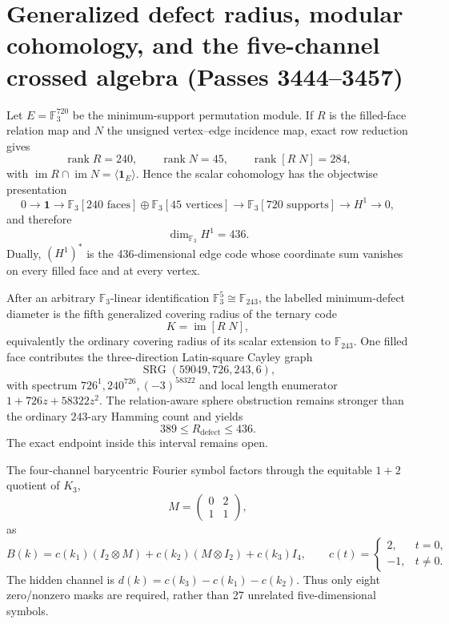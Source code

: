 \section{Generalized defect radius, modular cohomology, and the five-channel crossed algebra (Passes 3444--3457)}

Let $E=\mathbb F_3^{720}$ be the minimum-support permutation module.  If $R$ is the filled-face relation map and $N$ the unsigned vertex--edge incidence map, exact row reduction gives
\[
\operatorname{rank}R=240,
\qquad
\operatorname{rank}N=45,
\qquad
\operatorname{rank}[R\;N]=284,
\]
with $\operatorname{im}R\cap\operatorname{im}N=\langle\mathbf 1_E\rangle$.  Hence the scalar cohomology has the objectwise presentation
\[
0\longrightarrow\mathbf 1
\longrightarrow
\mathbb F_3[240\text{ faces}]\oplus\mathbb F_3[45\text{ vertices}]
\longrightarrow
\mathbb F_3[720\text{ supports}]
\longrightarrow H^1
\longrightarrow0,
\]
and therefore
\[
\boxed{\dim_{\mathbb F_3}H^1=436}.
\]
Dually, $(H^1)^*$ is the 436-dimensional edge code whose coordinate sum vanishes on every filled face and at every vertex.

After an arbitrary $\mathbb F_3$-linear identification $\mathbb F_3^5\cong\mathbb F_{243}$, the labelled minimum-defect diameter is the fifth generalized covering radius of the ternary code
\[
K=\operatorname{im}[R\;N],
\]
equivalently the ordinary covering radius of its scalar extension to $\mathbb F_{243}$.  One filled face contributes the three-direction Latin-square Cayley graph
\[
\operatorname{SRG}(59049,726,243,6),
\]
with spectrum $726^1,240^{726},(-3)^{58322}$ and local length enumerator $1+726z+58322z^2$.  The relation-aware sphere obstruction remains stronger than the ordinary $243$-ary Hamming count and yields
\[
\boxed{389\leq R_{\mathrm{defect}}\leq436}.
\]
The exact endpoint inside this interval remains open.

The four-channel barycentric Fourier symbol factors through the equitable $1+2$ quotient of $K_3$,
\[
M=\begin{pmatrix}0&2\\1&1\end{pmatrix},
\]
as
\[
B(k)=c(k_1)(I_2\otimes M)+c(k_2)(M\otimes I_2)+c(k_3)I_4,
\qquad
c(t)=\begin{cases}2,&t=0,\\-1,&t\ne0.\end{cases}
\]
The hidden channel is $d(k)=c(k_3)-c(k_1)-c(k_2)$.  Thus only eight zero/nonzero masks are required, rather than 27 unrelated five-dimensional symbols.

